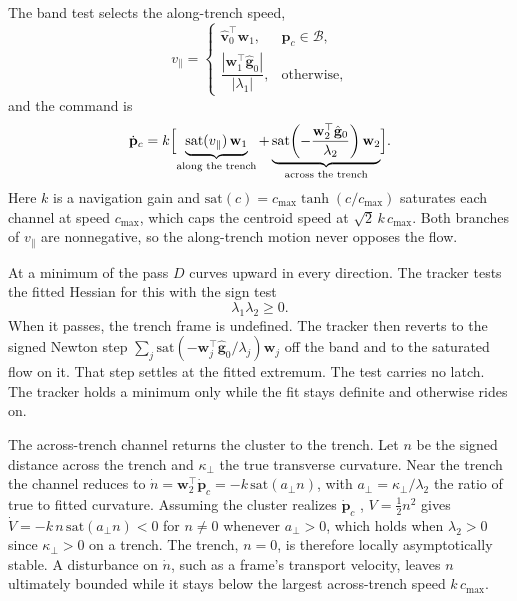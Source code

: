 \documentclass[lettersize,journal]{IEEEtran}
\begin{document}
The band test selects the along-trench speed,
\begin{equation}
    v_\parallel =
    \begin{cases}
        \hat{\mathbf{v}}_0^\top \mathbf{w}_1,
            & \mathbf{p}_c \in \mathcal{B}, \\[6pt]
        \dfrac{|\mathbf{w}_1^\top \hat{\mathbf{g}}_0|}{|\lambda_1|},
            & \text{otherwise},
    \end{cases}
    \label{eq:vpar}
\end{equation}
and the command is
\begin{equation}
    \dot{\mathbf{p}}_c = k\Bigl[
    \underbrace{\mathrm{sat}(v_\parallel)\,\mathbf{w}_1}_{\text{along the trench}}
    + \underbrace{\mathrm{sat}\!\left(-\frac{\mathbf{w}_2^\top
      \hat{\mathbf{g}}_0}{\lambda_2}\right)\mathbf{w}_2}_{\text{across the trench}}\Bigr].
    \label{eq:d_law}
\end{equation}
Here $k$ is a navigation gain and
$\mathrm{sat}(c) = c_{\max}\tanh(c/c_{\max})$ saturates each channel at
speed $c_{\max}$, which caps the centroid speed at $\sqrt{2}\,k\,c_{\max}$.
Both branches of $v_\parallel$ are nonnegative, so the along-trench
motion never opposes the flow.

At a minimum of the pass $D$ curves upward in every direction. The
tracker tests the fitted Hessian for this with the sign test
\begin{equation}
    \lambda_1 \lambda_2 \geq 0.
    \label{eq:d_capture}
\end{equation}
When it passes, the trench frame is undefined. The tracker then reverts
to the signed Newton step $\sum_j \mathrm{sat}(-\mathbf{w}_j^\top
\hat{\mathbf{g}}_0/\lambda_j)\mathbf{w}_j$ off the band and to the
saturated flow on it. That step settles at the fitted extremum. The test
carries no latch. The tracker holds a
minimum only while the fit stays definite and otherwise rides on.

The across-trench channel returns the cluster to the trench. Let $n$ be
the signed distance across the trench and $\kappa_\perp$ the true
transverse curvature. Near the trench the channel reduces to
$\dot{n} = \mathbf{w}_2^\top\dot{\mathbf{p}}_c = -k\,\mathrm{sat}(a_\perp n)$,
with $a_\perp = \kappa_\perp/\lambda_2$ the ratio of true to fitted
curvature. Assuming the cluster realizes $\dot{\mathbf{p}}_c$ \cite{37,3},
$V = \tfrac{1}{2}n^2$ gives $\dot{V} = -k\,n\,\mathrm{sat}(a_\perp n) < 0$
for $n \neq 0$ whenever $a_\perp > 0$, which holds when $\lambda_2 > 0$
since $\kappa_\perp > 0$ on a trench. The trench, $n = 0$, is therefore
locally asymptotically stable. A disturbance on $\dot{n}$, such as a
frame's transport velocity, leaves $n$ ultimately bounded while it stays
below the largest across-trench speed $k\,c_{\max}$.
\end{document}
